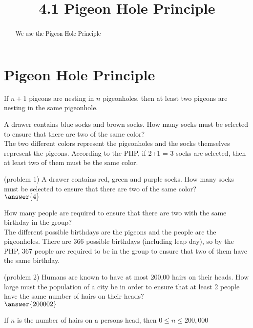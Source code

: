 \documentclass[handout]{ximera}
\title{4.1 Pigeon Hole Principle}
\begin{document}
\begin{abstract}
We use the Pigeon Hole Principle
\end{abstract}

\maketitle

\section{Pigeon Hole Principle}

\begin{proposition}
If $n+1$ pigeons are nesting in $n$ pigeonholes, then at least two pigeons are nesting in the same pigeonhole.
\end{proposition}

\begin{example}
A drawer contains blue socks and brown socks.  How many socks must be selected to ensure that there are two of the same color?\\
The two different colors represent the pigeonholes and the socks themselves represent the pigeons.  
According to the PHP, if 2+1 = 3 socks are selected, then at least two of them must be the same color.
\end{example}

\begin{problem}(problem 1)
A drawer contains red, green and purple socks. How many socks must be selected to ensure that there are two of the same color?\\
$\answer{4}$
\end{problem}


\begin{example}[example 2]
How many people are required to ensure that there are two with the same birthday in the group?\\
The different possible birthdays are the pigeons and the people are the pigeonholes.  
There are 366 possible birthdays (including leap day), so by the PHP, 367 people are required to be in the group to 
ensure that two of them have the same birthday.
\end{example}

\begin{problem}(problem 2)
Humans are known to have at most 200,00 hairs on their heads.  How large must the population of a city be in order to 
ensure that at least 2 people have the same number of hairs on their heads?\\
$\answer{200002}$

\begin{hint}
If $n$ is the number of hairs on a persons head, then $0 \leq n \leq 200,000$
\end{hint}

\end{problem}
\end{document}
